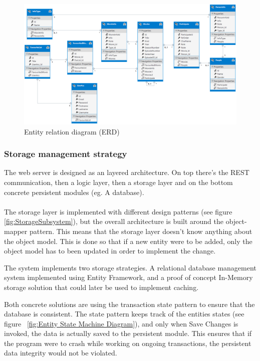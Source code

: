 \begin{figure}[H]
\includegraphics[width=\linewidth]{img/SDD/ER.png}
\caption{Entity relation diagram (ERD)}
\label{fig:ER Diagram}
\end{figure}

\subsubsection{Storage management strategy}
The web server is designed as an layered architecture. On top there's the REST communication, then a logic layer, then a storage layer and on the bottom concrete persistent modules (eg. A database).\\\\
The storage layer is implemented with different design patterns (see figure \ref{fig:StorageSubsystem}), but the overall architecture is built around the object-mapper pattern. This means that the storage layer doesn't know anything about the object model. This is done so that if a new entity were to be added, only the object model has to been updated in order to implement the change. 

The system implements two storage strategies. A relational database management system implemented using Entity Framework, and a proof of concept In-Memory storage solution that could later be used to implement caching. 

Both concrete solutions are using the transaction state pattern to ensure that the database is consistent. The state pattern keeps track of the entities states (see figure ~\ref{fig:Entity State Machine Diagram}), and only when Save Changes is invoked, the data is actually saved to the persistent module. This ensures that if the program were to crash while working on ongoing transactions, the persistent data integrity would not be violated.  

